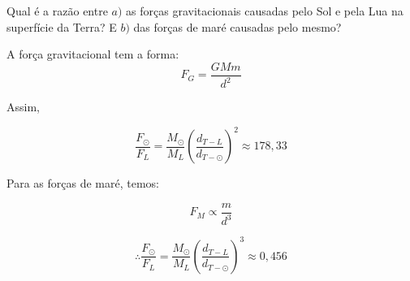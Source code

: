 \documentclass[11pt]{article}
\begin{document}
\begin{pproblem} Qual é a razão entre \(a)\) as forças gravitacionais causadas pelo Sol e pela Lua na superfície da Terra? E \(b)\) das forças de maré causadas pelo mesmo?
    \begin{pssolution*}{}{}
        \begin{alternativas}
            \item A força gravitacional tem a forma:
            \[F_G = \frac{GMm}{d^2}\]

            Assim,

            \[\frac{F_\odot}{F_L} = \frac{M_\odot}{M_L}\left(\frac{d_{T-L}}{d_{T-\odot}}\right)^2 \boxed{\approx 178,33}\]

            \item Para as forças de maré, temos:
            
            \[F_M \propto \frac{m}{d^3}\]

            \[\therefore \frac{F_\odot}{F_L} = \frac{M_\odot}{M_L}\left(\frac{d_{T-L}}{d_{T-\odot}}\right)^3 \boxed{\approx 0,456}\]

        \end{alternativas}
    \end{pssolution*}
\end{pproblem}
\end{document}
